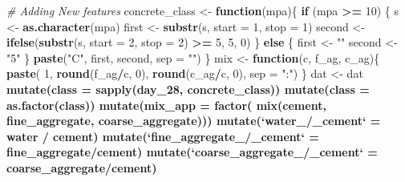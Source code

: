 \documentclass[
]{article}
\newenvironment{Shaded}{\begin{snugshade}}{\end{snugshade}}
\newcommand{\CommentTok}[1]{\textcolor[rgb]{0.56,0.35,0.01}{\textit{#1}}}
\newcommand{\ControlFlowTok}[1]{\textcolor[rgb]{0.13,0.29,0.53}{\textbf{#1}}}
\newcommand{\DataTypeTok}[1]{\textcolor[rgb]{0.13,0.29,0.53}{#1}}
\newcommand{\DecValTok}[1]{\textcolor[rgb]{0.00,0.00,0.81}{#1}}
\newcommand{\KeywordTok}[1]{\textcolor[rgb]{0.13,0.29,0.53}{\textbf{#1}}}
\newcommand{\NormalTok}[1]{#1}
\newcommand{\OperatorTok}[1]{\textcolor[rgb]{0.81,0.36,0.00}{\textbf{#1}}}
\newcommand{\StringTok}[1]{\textcolor[rgb]{0.31,0.60,0.02}{#1}}
\begin{document}
\begin{Shaded}
\begin{Highlighting}[]
\CommentTok{# Adding New features}
\NormalTok{concrete_class <-}\StringTok{ }\ControlFlowTok{function}\NormalTok{(mpa)\{}
  \ControlFlowTok{if}\NormalTok{ (mpa }\OperatorTok{>=}\StringTok{ }\DecValTok{10}\NormalTok{) \{}
\NormalTok{    s <-}\StringTok{ }\KeywordTok{as.character}\NormalTok{(mpa)}
\NormalTok{    first <-}\StringTok{ }\KeywordTok{substr}\NormalTok{(s, }\DataTypeTok{start =} \DecValTok{1}\NormalTok{, }\DataTypeTok{stop =} \DecValTok{1}\NormalTok{)}
\NormalTok{    second <-}\StringTok{ }\KeywordTok{ifelse}\NormalTok{(}\KeywordTok{substr}\NormalTok{(s, }\DataTypeTok{start =} \DecValTok{2}\NormalTok{, }\DataTypeTok{stop =} \DecValTok{2}\NormalTok{) }\OperatorTok{>=}\StringTok{ }\DecValTok{5}\NormalTok{, }\DecValTok{5}\NormalTok{, }\DecValTok{0}\NormalTok{)}
\NormalTok{  \}}
  \ControlFlowTok{else}\NormalTok{ \{}
\NormalTok{    first <-}\StringTok{ ""}
\NormalTok{    second <-}\StringTok{ "5"}
\NormalTok{  \}}
  \KeywordTok{paste}\NormalTok{(}\StringTok{"C"}\NormalTok{, first, second, }\DataTypeTok{sep =} \StringTok{""}\NormalTok{)}
\NormalTok{\}}
\NormalTok{mix <-}\StringTok{ }\ControlFlowTok{function}\NormalTok{(c, f_ag, c_ag)\{}
  \KeywordTok{paste}\NormalTok{(}
    \DecValTok{1}\NormalTok{,}
    \KeywordTok{round}\NormalTok{(f_ag}\OperatorTok{/}\NormalTok{c, }\DecValTok{0}\NormalTok{),}
    \KeywordTok{round}\NormalTok{(c_ag}\OperatorTok{/}\NormalTok{c, }\DecValTok{0}\NormalTok{),}
    \DataTypeTok{sep =} \StringTok{":"}\NormalTok{)}
\NormalTok{\}}
\NormalTok{dat <-}\StringTok{ }\NormalTok{dat }\OperatorTok{%
\StringTok{  }\KeywordTok{mutate}\NormalTok{(}\DataTypeTok{class =} \KeywordTok{sapply}\NormalTok{(day_}\DecValTok{28}\NormalTok{, concrete_class)) }\OperatorTok{%
\StringTok{  }\KeywordTok{mutate}\NormalTok{(}\DataTypeTok{class =} \KeywordTok{as.factor}\NormalTok{(class)) }\OperatorTok{%
\StringTok{  }\KeywordTok{mutate}\NormalTok{(}\DataTypeTok{mix_app =} \KeywordTok{factor}\NormalTok{(}
    \KeywordTok{mix}\NormalTok{(cement, fine_aggregate, coarse_aggregate))) }\OperatorTok{%
\StringTok{  }\KeywordTok{mutate}\NormalTok{(}\StringTok{`}\DataTypeTok{water_/_cement}\StringTok{`}\NormalTok{ =}\StringTok{ }\NormalTok{water }\OperatorTok{/}\StringTok{ }\NormalTok{cement) }\OperatorTok{%
\StringTok{  }\KeywordTok{mutate}\NormalTok{(}\StringTok{`}\DataTypeTok{fine_aggregate_/_cement}\StringTok{`}\NormalTok{ =}\StringTok{ }\NormalTok{fine_aggregate}\OperatorTok{/}\NormalTok{cement) }\OperatorTok{%
\StringTok{  }\KeywordTok{mutate}\NormalTok{(}\StringTok{`}\DataTypeTok{coarse_aggregate_/_cement}\StringTok{`}\NormalTok{ =}\StringTok{ }\NormalTok{coarse_aggregate}\OperatorTok{/}\NormalTok{cement) }\OperatorTok{%
}}}}}}}
\end{Highlighting}
\end{Shaded}
\end{document}
